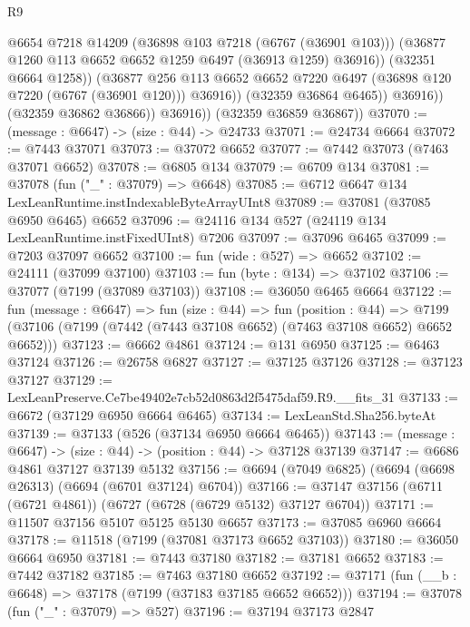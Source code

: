 \begin{lexlean}{R9}
\begin{coremodule}
                        @6654
                        @7218
                        @14209
                        (@36898 @103 @7218 (@6767 (@36901 @103)))
                        (@36877 @1260 @113 @6652 @6652 @1259 @6497 (@36913 @1259) @36916))
                      (@32351 @6664 @1258))
                    (@36877
                      @256
                      @113
                      @6652
                      @6652
                      @7220
                      @6497
                      (@36898 @120 @7220 (@6767 (@36901 @120)))
                      @36916))
                  (@32359 @36864 @6465))
                @36916))
            (@32359 @36862 @36866))
          @36916))
      (@32359 @36859 @36867))
@37070 := (message : @6647) -> (size : @44) -> @24733
@37071 := @24734 @6664
@37072 := @7443 @37071
@37073 := @37072 @6652
@37077 := @7442 @37073 (@7463 @37071 @6652)
@37078 := @6805 @134
@37079 := @6709 @134
@37081 := @37078 (fun ("_" : @37079) => @6648)
@37085 := @6712 @6647 @134 LexLeanRuntime.instIndexableByteArrayUInt8
@37089 := @37081 (@37085 @6950 @6465) @6652
@37096 := @24116 @134 @527 (@24119 @134 LexLeanRuntime.instFixedUInt8) @7206
@37097 := @37096 @6465
@37099 := @7203 @37097 @6652
@37100 := fun (wide : @527) => @6652
@37102 := @24111 (@37099 @37100)
@37103 := fun (byte : @134) => @37102
@37106 := @37077 (@7199 (@37089 @37103))
@37108 := @36050 @6465 @6664
@37122 := fun (message : @6647) =>
  fun (size : @44) =>
  fun (position : @44) =>
  @7199 (@37106 (@7199 (@7442 (@7443 @37108 @6652) (@7463 @37108 @6652) @6652 @6652)))
@37123 := @6662 @4861
@37124 := @131 @6950
@37125 := @6463 @37124
@37126 := @26758 @6827
@37127 := @37125 @37126
@37128 := @37123 @37127
@37129 := LexLeanPreserve.Ce7be49402e7cb52d0863d2f5475daf59.R9.__fits_31
@37133 := @6672 (@37129 @6950 @6664 @6465)
@37134 := LexLeanStd.Sha256.byteAt
@37139 := @37133 (@526 (@37134 @6950 @6664 @6465))
@37143 := (message : @6647) -> (size : @44) -> (position : @44) -> @37128 @37139
@37147 := @6686 @4861 @37127 @37139 @5132
@37156 := @6694 (@7049 @6825) (@6694 (@6698 @26313) (@6694 (@6701 @37124) @6704))
@37166 := @37147 @37156 (@6711 (@6721 @4861)) (@6727 (@6728 (@6729 @5132) @37127 @6704))
@37171 := @11507 @37156 @5107 @5125 @5130 @6657
@37173 := @37085 @6960 @6664
@37178 := @11518 (@7199 (@37081 @37173 @6652 @37103))
@37180 := @36050 @6664 @6950
@37181 := @7443 @37180
@37182 := @37181 @6652
@37183 := @7442 @37182
@37185 := @7463 @37180 @6652
@37192 := @37171 (fun (__b : @6648) => @37178 (@7199 (@37183 @37185 @6652 @6652)))
@37194 := @37078 (fun ("_" : @37079) => @527)
@37196 := @37194 @37173 @2847

\end{coremodule}
\end{lexlean}
